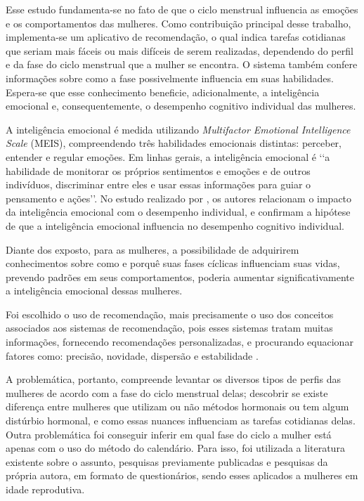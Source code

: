 Esse estudo fundamenta-se no fato de que o ciclo menstrual influencia as emoções e os comportamentos 
das mulheres. Como contribuição principal desse trabalho, implementa-se um aplicativo de recomendação, o qual 
indica tarefas cotidianas que seriam mais fáceis ou mais difíceis de serem realizadas, dependendo do 
perfil e da fase do ciclo menstrual que a mulher se encontra. O sistema também confere informações sobre como 
a fase possivelmente influencia em suas habilidades. Espera-se que esse conhecimento beneficie, 
adicionalmente, a inteligência emocional e, consequentemente, o desempenho cognitivo individual das 
mulheres. 

A inteligência emocional é medida utilizando \textit{Multifactor Emotional Intelligence Scale} (MEIS), 
compreendendo três habilidades emocionais distintas: perceber, entender e regular emoções. Em linhas 
gerais, a inteligência 
emocional é \lq \lq a habilidade de monitorar os próprios sentimentos e emoções e de outros indivíduos, 
discriminar entre eles e usar essas informações para guiar o pensamento e ações\rq \rq  \cite{salovey1990}. 
No estudo realizado por , os autores relacionam o impacto da inteligência emocional 
com o desempenho individual, e confirmam a hipótese de 
que a inteligência emocional influencia no desempenho cognitivo individual. 

Diante dos exposto, para as mulheres, 
a possibilidade de adquirirem conhecimentos sobre como e porquê suas fases cíclicas influenciam suas vidas, 
prevendo padrões em seus comportamentos, poderia aumentar 
significativamente a inteligência emocional dessas mulheres. 


Foi escolhido o uso de recomendação, mais precisamente o uso dos conceitos associados aos sistemas de recomendação, pois esses sistemas tratam muitas informações, fornecendo recomendações personalizadas, 
e procurando equacionar fatores como: precisão, novidade, dispersão e estabilidade \cite{bobadilla2013}.


A problemática, portanto, compreende levantar os diversos tipos de perfis das mulheres de acordo com a 
fase do ciclo menstrual delas; descobrir se existe diferença entre mulheres que utilizam ou não métodos 
hormonais ou tem algum distúrbio hormonal, e como essas nuances influenciam as tarefas cotidianas delas. 
Outra problemática foi conseguir inferir em qual fase do ciclo a mulher está apenas com o 
uso do método do calendário. 
Para isso, foi utilizada a literatura existente sobre o assunto, pesquisas previamente publicadas e 
pesquisas da própria autora, em formato de questionários, sendo esses aplicados a mulheres em idade 
reprodutiva.


